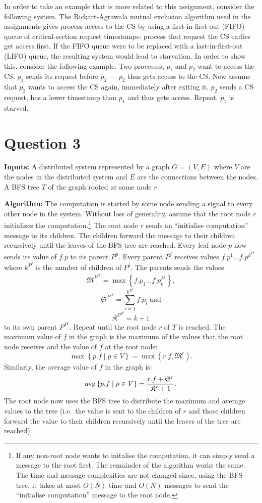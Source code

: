 \documentclass[a4paper,onecolumn,oneside]{article}
\DeclareMathOperator{\avg}{avg}
\begin{document}
In order to take an example that is more related to this assignment, consider
the following system.  The Rickart-Agrawala mutual exclusion algorithm used in
the assignments gives process access to the CS by using a first-in-first-out
(FIFO) queue of critical-section request timestamps: process that request the CS
earlier get access first.  If the FIFO queue were to be replaced with a
last-in-first-out (LIFO) queue, the resulting system would lead to starvation.
In order to show this, consider the following example.  Two processes, $p_1$ and
$p_2$ want to access the CS\@.  $p_1$ sends its request before $p_2$ --- $p_2$
thus gets access to the CS\@.  Now assume that $p_2$ wants to access the CS
again, immediately after exiting it.  $p_2$ sends a CS request, has a lower
timestamp than $p_1$ and thus gets access.  Repeat.  $p_1$ is starved.

\section*{Question 3}

\textbf{Inputs:}  A distributed system represented by a graph $G=(V,E)$ where
$V$ are the nodes in the distributed system and $E$ are the connections between
the nodes.  A BFS tree $T$ of the graph rooted at some node $r$.

\textbf{Algorithm:}  The computation is started by some node sending a signal to
every other node in the system.  Without loss of generality, assume that the
root node $r$ initializes the computation.\footnote{If any non-root node wants
to initalise the computation, it can simply send a message to the root first.
The remainder of the algorithm works the same.  The time and message
complexities are not changed since, using the BFS tree, it takes at most $O(N)$
time and $O(N)$ messages to send the ``initialise computation'' message to the
root node.}  The root node $r$ sends an ``initialise computation'' message to
its children.  The children forward the message to their children recursively
until the leaves of the BFS tree are reached.  Every leaf node $p$ now sends its
value of $f.p$ to its parent $P^p$.  Every parent $P^j$ receives values
$f.p^1\ldots f.p^{k^{P^j}}$ where $k^{P^j}$ is the number of children of $P^j$.
The parents sends the values
$$\mathfrak{M}^{P^{P^j}} = \max\left\{f.p_1\ldots f.p_k^{P^j}\right\},$$
$$\mathfrak{S}^{P^{P^j}} = \sum\limits_{i=1}^{k^{P^j}} f.p_i\;\mathrm{and}$$
$$\mathfrak{K}^{P^{P^j}} = k + 1$$
to its own parent $P^{P^j}$.
Repeat until the root node $r$ of $T$ is reached.  The maximum value of $f$ in
the graph is the maximum of the values that the root node receives and the value
of $f$ at the root node:
$$\max\left\{p.f \mid p \in V\right\} = \max(r.f, \mathfrak{M}^r).$$
Similarly, the average value
of $f$ in the graph is:
$$\avg\left\{p.f \mid p \in V\right\} = {r.f + \mathfrak{S}^r \over \mathfrak{K}^r + 1}.$$
The root node now uses the BFS tree to distribute the maximum and average values
to the tree (i.e.\ the value is sent to the children of $r$ and those children
forward the value to their children recursively until the leaves of the tree are
reached).
\end{document}

